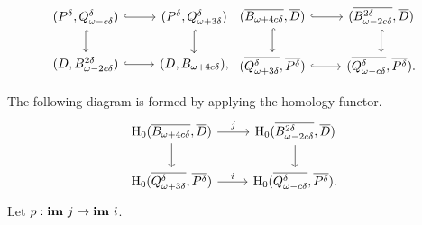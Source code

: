 \[ \begin{tikzcd}
  (\P, \Q^\delta) \arrow[hookrightarrow]{r}\arrow[hookrightarrow]{d} &
  (\P, \QQ^\delta) \arrow[hookrightarrow]{d} \\
  (D, \bb) \arrow[hookrightarrow]{r} &
  (D, \BB),
\end{tikzcd}\begin{tikzcd}
  (\cmp{\BB},\cmp{D})\arrow[hookrightarrow]{d}\arrow[hookrightarrow]{r} & %
  (\cmp{\bb}, \cmp{D}) \arrow[hookrightarrow]{d}\\
  (\cmp{\QQ^\delta}, \cmp{\P}) \arrow[hookrightarrow]{r} & %
  (\cmp{\Q^\delta}, \cmp{\P}).
\end{tikzcd}\]

The following diagram is formed by applying the homology functor.
\begin{equation}\label{dgm:1}\begin{tikzcd}
  \hom_0(\cmp{\BB},\cmp{D})\arrow{d} \arrow{r}{j} & %
  \hom_0(\cmp{\bb}, \cmp{D}) \arrow{d} \\
  \hom_0(\cmp{\QQ^\delta}, \cmp{\P}) \arrow{r}{i} & %
  \hom_0(\cmp{\Q^\delta}, \cmp{\P}).
\end{tikzcd}\end{equation}
Let $p : \mathbf{im}~j\to\mathbf{im}~i$.


